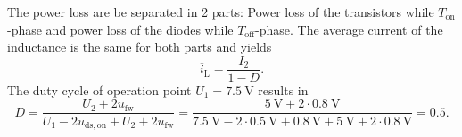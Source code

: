 
\begin{solutionblock}
	The power loss are be separated in 2 parts: Power loss of the transistors while $T_\mathrm{on}$-phase and power loss of the diodes while $T_\mathrm{off}$-phase.
	The average current of the inductance is the same for both parts and yields
	\begin{equation*}
		\overline{i}_\mathrm{L} = \frac{I_\mathrm{2}}{1-D}.
	\end{equation*}
	The duty cycle of operation point $U_\mathrm{1}=\SI{7.5}{\volt}$ results in
	\begin{equation*}
		D = \frac{U_\mathrm{2}+2u_\mathrm{fw}}{U_\mathrm{1}-2u_\mathrm{ds,on}+U_\mathrm{2}+2u_\mathrm{fw}}
		= \frac{\SI{5}{\volt}+ 2 \cdot \SI{0.8}{\volt}}{\SI{7.5}{\volt} - 2 \cdot \SI{0.5}{\volt}+\SI{0.8}{\volt + \SI{5}{\volt}+ 2 \cdot \SI{0.8}{\volt}}}
		= 0.5.
	\end{equation*}


\end{solutionblock}
